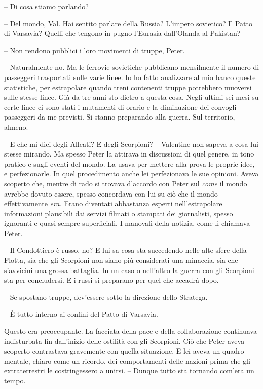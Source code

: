 {-- Di cosa stiamo parlando?}

{-- Del mondo, Val. Hai sentito parlare della Russia? L'impero
	sovietico? Il Patto di Varsavia? Quelli che tengono in pugno l'Eurasia
	dall'Olanda al Pakistan?}

{-- Non rendono pubblici i loro movimenti di truppe, Peter.}

{-- Naturalmente no. Ma le ferrovie sovietiche pubblicano mensilmente il
	numero di passeggeri trasportati sulle varie linee. Io ho fatto
	analizzare al mio banco queste statistiche, per estrapolare quando treni
	contenenti truppe potrebbero muoversi sulle stesse linee. Già da tre
	anni sto dietro a questa cosa. Negli ultimi sei mesi su certe linee ci
	sono stati i mutamenti di orario e la diminuzione dei convogli
	passeggeri da me previsti. Si stanno preparando alla guerra. Sul
	territorio, almeno.}

{-- E che mi dici degli Alleati? E degli Scorpioni? -- Valentine non
	sapeva a cosa lui stesse mirando. Ma spesso Peter la attirava in
	discussioni di quel genere, in tono pratico e sugli eventi del mondo. La
	usava per mettere alla prova le proprie idee, e perfezionarle. In quel
	procedimento anche lei perfezionava le sue opinioni. Aveva scoperto che,
	mentre di rado si trovava d'accordo con Peter sul \emph{come} il mondo
	avrebbe dovuto essere, spesso concordava con lui su ciò che il mondo
	effettivamente \emph{era.} Erano diventati abbastanza esperti
	nell'estrapolare informazioni plausibili dai servizi filmati o stampati
	dei giornalisti, spesso ignoranti e quasi sempre superficiali. I
	manovali della notizia, come li chiamava Peter.}

{-- Il Condottiero è russo, no? E lui sa cosa sta succedendo nelle alte
	sfere della Flotta, sia che gli Scorpioni non siano più considerati una
	minaccia, sia che s'avvicini una grossa battaglia. In un caso o
	nell'altro la guerra con gli Scorpioni sta per concludersi. E i russi si
	preparano per quel che accadrà dopo.}

{-- Se spostano truppe, dev'essere sotto la direzione dello Stratega.}

{-- È tutto interno ai confini del Patto di Varsavia.}

{Questo era preoccupante. La facciata della pace e della collaborazione
	continuava indisturbata fin dall'inizio delle ostilità con gli
	Scorpioni. Ciò che Peter aveva scoperto contrastava gravemente con
	quella situazione. E lei aveva un quadro mentale, chiaro come un
	ricordo, dei comportamenti delle nazioni prima che gli extraterrestri le
	costringessero a unirsi. -- Dunque tutto sta tornando com'era un tempo.}

